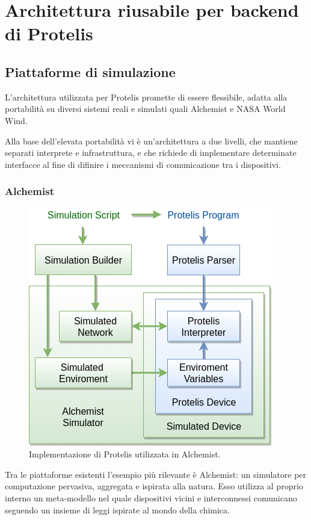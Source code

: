 \chapter{Architettura riusabile per backend di Protelis}
\section{Piattaforme di simulazione}
L'architettura utilizzata per Protelis promette di essere flessibile, adatta
alla portabilità su diversi sistemi reali\cite{Clark2015} e simulati quali
Alchemist\cite{alchemist} e NASA World Wind\cite{Bell2007}.

Alla base dell'elevata portabilità vi è un'architettura a due livelli, che
mantiene separati interprete e infrastruttura, e che richiede di implementare
determinate interfacce al fine di difinire i meccanismi di comunicazione tra i
dispositivi.

\subsection{Alchemist}
\begin{figure}
  \centering
  \includegraphics[width=0.7\linewidth]{images/alchemist-architecture.png}
  \caption{Implementazione di Protelis utilizzata in Alchemist.}
  \label{fig:alchemist-architecture}
\end{figure}
Tra le piattaforme esistenti l'esempio più rilevante è
Alchemist\cite{alchemist}: un simulatore per
computazione pervasiva, aggregata e ispirata alla natura. Esso utilizza al
proprio interno un meta-modello nel quale dispositivi vicini e interconnessi
comunicano seguendo un insieme di leggi ispirate al mondo della chimica.

